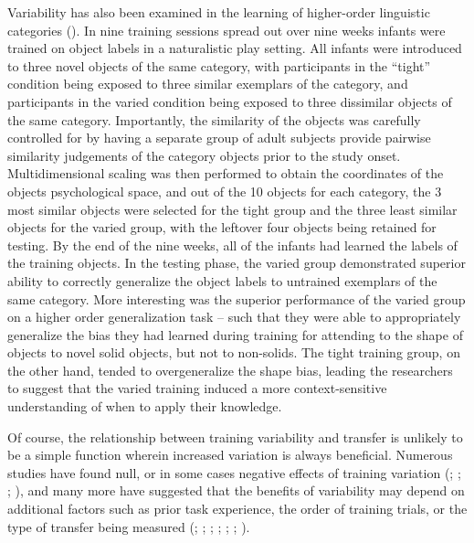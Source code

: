 \documentclass[
  11pt,
  letterpaper,
]{article}
\begin{document}
Variability has also been examined in the learning of higher-order
linguistic categories (). In nine training sessions spread out over nine weeks
infants were trained on object labels in a naturalistic play setting.
All infants were introduced to three novel objects of the same category,
with participants in the ``tight'' condition being exposed to three
similar exemplars of the category, and participants in the varied
condition being exposed to three dissimilar objects of the same
category. Importantly, the similarity of the objects was carefully
controlled for by having a separate group of adult subjects provide
pairwise similarity judgements of the category objects prior to the
study onset. Multidimensional scaling was then performed to obtain the
coordinates of the objects psychological space, and out of the 10
objects for each category, the 3 most similar objects were selected for
the tight group and the three least similar objects for the varied
group, with the leftover four objects being retained for testing. By the
end of the nine weeks, all of the infants had learned the labels of the
training objects. In the testing phase, the varied group demonstrated
superior ability to correctly generalize the object labels to untrained
exemplars of the same category. More interesting was the superior
performance of the varied group on a higher order generalization task --
such that they were able to appropriately generalize the bias they had
learned during training for attending to the shape of objects to novel
solid objects, but not to non-solids. The tight training group, on the
other hand, tended to overgeneralize the shape bias, leading the
researchers to suggest that the varied training induced a more
context-sensitive understanding of when to apply their knowledge.

Of course, the relationship between training variability and transfer is
unlikely to be a simple function wherein increased variation is always
beneficial. Numerous studies have found null, or in some cases negative
effects of training variation
(;
; ; ), and many more have suggested that the benefits of
variability may depend on additional factors such as prior task
experience, the order of training trials, or the type of transfer being
measured (;
; ; ; ; ;
).
\end{document}
